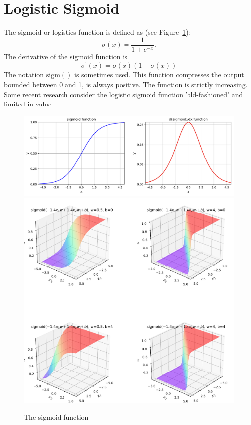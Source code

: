 \section{Logistic Sigmoid}

The sigmoid or logistics function is defined as (see Figure~\ref{fig:sigmoid}):
\begin{equation}
\sigma(x)
=\frac{1}{1+e^{-x}}.
\end{equation}  
The derivative of the sigmoid function is 
\begin{equation}
 \sigma^\prime(x)
 =\sigma(x)(1-\sigma(x))
\end{equation}
The notation $\textrm{sigm}()$ is sometimes used.
This function compresses the output bounded between 0 and 1, is always positive. The function is strictly increasing. Some recent research consider the logistic sigmoid function 'old-fashioned' and limited in value.

\begin{figure}[p]
\centering
\includegraphics[width=\textwidth]{pic/sigmoid01}
\includegraphics[width=\textwidth]{pic/sigmoid02}
\caption{The sigmoid function }
\label{fig:sigmoid}
\end{figure}


